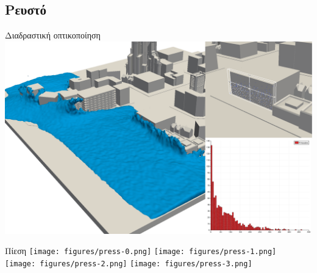 \documentclass[8pt,sans,mathserif,aspectratio=43]{beamer}
\begin{document}
\subsection{Ρευστό}

\begin{frame}{Διαδραστική οπτικοποίηση}
  \includegraphics[width=\textwidth]{figures/paraview.png}
\end{frame}


\begin{frame}{Πίεση}
  \texttt{[image: figures/press-0.png]}
  \texttt{[image: figures/press-1.png]}\\
  \texttt{[image: figures/press-2.png]}
  \texttt{[image: figures/press-3.png]}
\end{frame}

\end{document}
